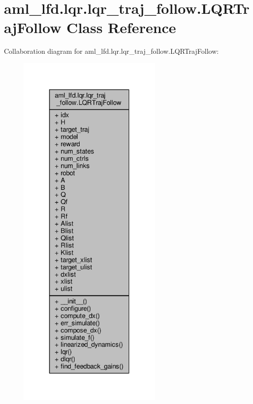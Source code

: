 \hypertarget{classaml__lfd_1_1lqr_1_1lqr__traj__follow_1_1_l_q_r_traj_follow}{\section{aml\-\_\-lfd.\-lqr.\-lqr\-\_\-traj\-\_\-follow.\-L\-Q\-R\-Traj\-Follow Class Reference}
\label{classaml__lfd_1_1lqr_1_1lqr__traj__follow_1_1_l_q_r_traj_follow}
}


Collaboration diagram for aml\-\_\-lfd.\-lqr.\-lqr\-\_\-traj\-\_\-follow.\-L\-Q\-R\-Traj\-Follow\-:
\nopagebreak
\begin{figure}[H]
\begin{center}
\leavevmode
\includegraphics[width=200pt]{classaml__lfd_1_1lqr_1_1lqr__traj__follow_1_1_l_q_r_traj_follow__coll__graph}
\end{center}
\end{figure}
